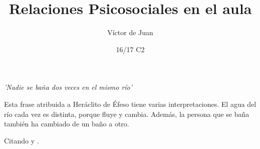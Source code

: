 \documentclass[palatino]{apuntesURJC}
\title{Relaciones Psicosociales en el aula}
\author{Víctor de Juan}
\date{16/17 C2}
\begin{document}
\pagestyle{plain}
\maketitle

\tableofcontents
\newpage

\textit{’Nadie se baña dos veces en el mismo río’}

Esta frase atribuida a Heráclito de Éfeso tiene varias interpretaciones. 
%
El agua del río cada vez es distinta, porque fluye y cambia. 
%
Además, la persona que se baña también ha cambiado de un baño a otro.

Citando \cite{Tema1} y \cite{Tema2}.

\appendix




  
\label{bibliografia}

\printindex
\end{document}
